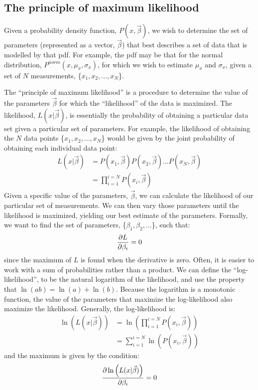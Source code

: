 \subsection{The principle of maximum likelihood}
Given a probability density function, $P(x,\vec\beta)$, we wish to determine the set of parameters (represented as a vector, $\vec\beta$) that best describes a set of data that is modelled by that pdf.  For example, the pdf may be that for the normal distribution, $P^{norm}(x,\mu_x,\sigma_x)$, for which we wish to estimate $\mu_x$ and $\sigma_x$, given a set of $N$ measurements, \{$x_1, x_2, \dots,x_N$\}.

The ``principle of maximum likelihood'' is a procedure to determine the value of the parameters $\vec\beta$ for which the ``likelihood'' of the data is maximized. The likelihood, $L(x|\vec\beta)$, is essentially the probability of obtaining a particular data set given a particular set of parameters. For example, the likelihood of obtaining the $N$ data points \{$x_1, x_2, \dots,x_N$\} would be given by the joint probability of obtaining each individual data point:
\begin{align}
L(x|\vec\beta)&=P(x_1,\vec\beta)P(x_2,\vec\beta)\dots P(x_N,\vec\beta)\nonumber\\
&=\prod_{i=1}^{i=N}P(x_i,\vec\beta)
\end{align}
Given a specific value of the parameters, $\vec\beta$, we can calculate the likelihood of our particular set of measurements. We can then vary those parameters until the likelihood is maximized, yielding our best estimate of the parameters. Formally, we want to find the set of parameters, \{$\beta_1,\beta_2,\dots$\}, such that:
\begin{align}
\frac{\partial L}{\partial \beta_i}=0
\end{align}
since the maximum of $L$ is found when the derivative is zero. Often, it is easier to work with a sum of probabilities rather than a product. We can define the ``log-likelihood'', to be the natural logarithm of the likelihood, and use the property that $\ln(ab)=\ln(a)+\ln(b)$. Because the logarithm is a monotonic function, the value of the parameters that maximize the log-likelihood also maximize the likelihood. Generally, the log-likelihood is:
\begin{align*}
\ln \left(L(x|\vec\beta)\right) &= \ln \left( \prod_{i=1}^{i=N}P(x_i,\vec\beta) \right) \\
& = \sum_{i=1}^{i=N} \ln\left(P(x_i,\vec\beta)\right)
\end{align*}
and the maximum is given by the condition:
\begin{align}
\frac{\partial \ln \left(L(x|\vec\beta)\right)}{\partial \beta_i}=0
\end{align}

